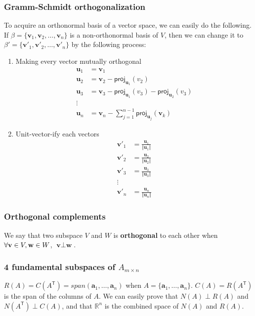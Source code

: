 \documentclass[12pt]{article}
\begin{document}
\subsubsection*{Gramm-Schmidt orthogonalization}
To acquire an orthonormal basis of a vector space, we can easily do the following. If $\beta = \{\textbf{v}_1,\textbf{v}_2,\ldots,\textbf{v}_n\}$ is a non-orthonormal basis of $V$, then we can change it to $\beta' = \{\textbf{v}'_1,\textbf{v}'_2,\ldots,\textbf{v}'_n\}$ by the following process:
\begin{enumerate}
\item Making every vector mutually orthogonal\\
\begin{align*}
\textbf{u}_1&=\textbf{v}_1\\
\textbf{u}_2&=\textbf{v}_2 - \textsf{proj}_{\textbf{u}_1}(v_2)\\
\textbf{u}_3&=\textbf{v}_3 - \textsf{proj}_{\textbf{u}_1}(v_3) - \textsf{proj}_{\textbf{u}_2}(v_3)\\
\vdots\\
\textbf{u}_n&=\textbf{v}_n-\sum^{n-1}_{j=1}\textsf{proj}_{\textbf{u}_j}(\textbf{v}_k)
\end{align*}
\item Unit-vector-ify each vectors
\begin{align*}
\textbf{v}'_1&=\frac{\textbf{u}_1}{\Vert \textbf{u}_1\Vert}\\
\textbf{v}'_2&=\frac{\textbf{u}_2}{\Vert \textbf{u}_2\Vert}\\
\textbf{v}'_3&=\frac{\textbf{u}_3}{\Vert \textbf{u}_3\Vert}\\
\vdots\\
\textbf{v}'_n&=\frac{\textbf{u}_n}{\Vert \textbf{u}_n\Vert}
\end{align*}
\end{enumerate}
\subsubsection*{Orthogonal complements}
We say that two subspace $V$ and $W$ is \textbf{orthogonal} to each other when $\forall \textbf v\in V, \textbf w\in W$, $\textbf{v} \perp \textbf{w}	$.


\subsubsection*{4 fundamental subspaces of $A_{m\times n}$}
$R(A) = C(A^\textsf{T}) = span(\textbf{a}_1,\ldots,\textbf{a}_n)$ when $A = \{\textbf{a}_1,\ldots,\textbf{a}_n \} $. $C(A) = R(A^\textsf{T})$ is the span of the columns of $A$. We can easily prove that $N(A) \perp R(A)$ and $N(A^\textsf{T}) \perp C(A)$, and that $\mathbb{R}^n$ is the combined space of $N(A)$ and $R(A)$.
\end{document}
